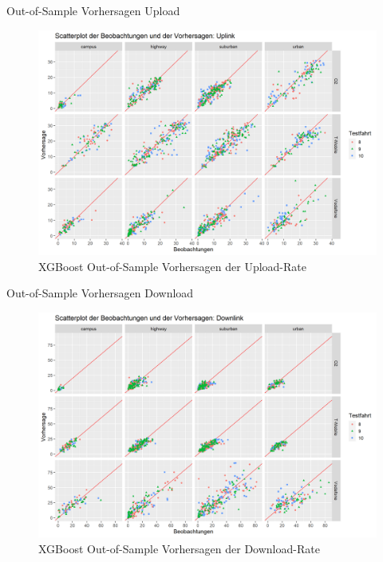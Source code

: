 \begin{frame}{Out-of-Sample Vorhersagen Upload}
    \begin{figure}[h]
        \centering
        \includegraphics[scale=0.33]{plots/xgboost/uplink/scatter_colored_axes_fixed}
        \caption{XGBoost Out-of-Sample Vorhersagen der Upload-Rate}
        \label{xgboost_scatter_colored_uplink}
    \end{figure}
\end{frame}

\begin{frame}{Out-of-Sample Vorhersagen Download}
    \begin{figure}[h]
        \centering
        \includegraphics[scale=0.33]{plots/xgboost/downlink/scatter_colored_axes_fixed}
        \caption{XGBoost Out-of-Sample Vorhersagen der Download-Rate}
        \label{xgboost_scatter_colored_downlink}
    \end{figure}
\end{frame}